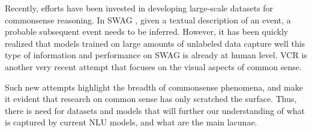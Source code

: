 Recently, efforts have been invested in developing large-scale datasets for commonsense reasoning. In SWAG \cite{zellers2018swag}, given a textual description of an event, a probable subsequent event needs to be inferred. However, it has been quickly realized that models trained on large amounts of unlabeled data \cite{devlin2018BERT} capture well this type of information and performance on SWAG is already at human level. VCR \cite{zellers2018recognition} is another very recent attempt that focuses on the visual aspects of common sense.

Such new attempts highlight the breadth of commonsense phenomena, and make it evident that research on common sense has only scratched the surface. Thus, there is need for datasets and models that will further our understanding of what is captured by current NLU models, and what are the main lacunae.

